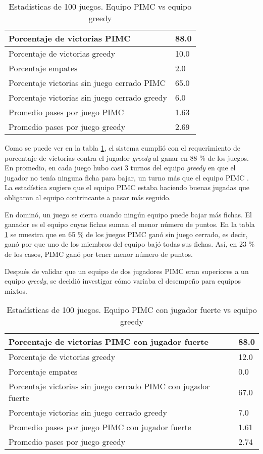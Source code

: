 \begin{table}[!ht]
    \centering
    \caption{Estadísticas de 100 juegos. Equipo PIMC vs equipo greedy}
    \begin{tabular}{|l|l|}
    \hline
        Porcentaje de victorias PIMC & 88.0 \\ \hline
        Porcentaje de victorias greedy & 10.0 \\ \hline
        Porcentaje empates & 2.0 \\ \hline
        Porcentaje victorias sin juego cerrado PIMC & 65.0 \\ \hline
        Porcentaje victorias sin juego cerrado greedy & 6.0 \\ \hline
        Promedio pases por juego PIMC & 1.63 \\ \hline
        Promedio pases por juego greedy & 2.69 \\ \hline
    \end{tabular}
    \label{MINP}
\end{table}

Como se puede ver en la tabla \ref{MINP}, el sistema cumplió con el
requerimiento de porcentaje de victorias contra el jugador \textit{greedy} al
ganar en 88 \% de los juegos. En promedio, en cada juego hubo casi 3 turnos del
equipo \textit{greedy} en que el jugador no tenía ninguna ficha para bajar, un
turno más que el equipo PIMC . La estadística sugiere que el equipo PIMC estaba
haciendo buenas jugadas que obligaron al equipo contrincante a pasar más
seguido.

En dominó, un juego se cierra cuando ningún equipo puede bajar más fichas. El
ganador es el equipo cuyas fichas suman el menor número de puntos. En la tabla
\ref{MINP} se muestra que en 65 \% de los juegos PIMC ganó sin juego cerrado, es
decir, ganó por que uno de los miembros del equipo bajó todas sus fichas. Así,
en 23 \% de los casos, PIMC ganó por tener menor número de puntos.


Después de validar que un equipo de dos jugadores PIMC eran superiores a un
equipo \textit{greedy}, se decidió investigar cómo variaba el desempeño para
equipos mixtos.

\begin{table}[!ht]
    \centering
    \small
    \caption{Estadísticas de 100 juegos. Equipo PIMC con jugador fuerte vs equipo greedy}
    \begin{tabular}{|l|l|}
    \hline
        Porcentaje de victorias PIMC con jugador fuerte & 88.0 \\ \hline
        Porcentaje de victorias greedy & 12.0 \\ \hline
        Porcentaje empates & 0.0 \\ \hline
        Porcentaje victorias sin juego cerrado PIMC con jugador fuerte & 67.0 \\ \hline
        Porcentaje victorias sin juego cerrado greedy & 7.0 \\ \hline
        Promedio pases por juego PIMC con jugador fuerte & 1.61 \\ \hline
        Promedio pases por juego greedy & 2.74 \\ \hline
    \end{tabular}
    \label{MIXS}
\end{table}

